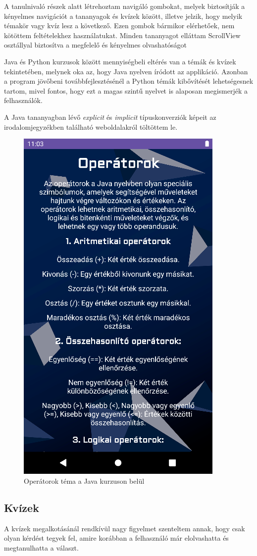 \documentclass{thesis-ekf}
\begin{document}
A tanulnivaló részek alatt létrehoztam navigáló gombokat, melyek biztosítják a kényelmes navigációt a tananyagok és kvízek között, illetve jelzik, hogy melyik témakör vagy kvíz lesz a következő. Ezen gombok bármikor elérhetőek, nem kötöttem feltételekhez használatukat. Minden tananyagot elláttam ScrollView osztállyal biztosítva a megfelelő és kényelmes olvashatóságot

Java és Python kurzusok között mennyiségbeli eltérés van a témák és kvízek tekintetében, melynek oka az, hogy Java nyelven íródott az applikáció. Azonban a program jövőbeni továbbfejlesztésénél a Python témák kibővítését lehetségesnek tartom, mivel fontos, hogy ezt a magas szintű nyelvet is alaposan megismerjék a felhasználók.

A Java tananyagban lévő \textit{explicit}\cite{explicit} és \textit{implicit}\cite{implicit} típuskonverziók képeit az irodalomjegyzékben található weboldalakról töltöttem le.

\begin{figure}[tbh]
	\centering
	\includegraphics[width=0.6\linewidth]{operatorok}
	\caption{Operátorok téma a Java kurzuson belül}
	\label{operatorok}
\end{figure}

\subsection{Kvízek}
A kvízek megalkotásánál rendkívül nagy figyelmet szenteltem annak, hogy csak olyan kérdést tegyek fel, amire korábban a felhasználó már elolvashatta és megtanulhatta a választ.
\end{document}
